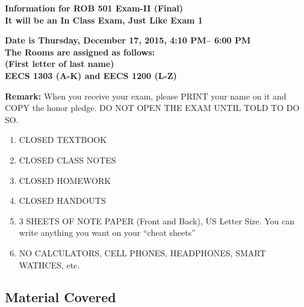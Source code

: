 \documentclass[letterpaper]{article}
\begin{document}



\vspace*{.1in}
\begin{center}
\LARGE \bf
Information for ROB 501 Exam-II (Final)\\
\large
It will be an In Class Exam, Just Like Exam 1
\end{center}
\vspace*{1in}

\begin{center}
\LARGE \bf
Date is Thursday, December 17, 2015, 4:10 PM-- 6:00 PM \\
\large
The Rooms are assigned as follows: \\
(First letter of last name)\\
 EECS 1303 (A-K) and EECS 1200 (L-Z) \\
\end{center}
\vspace*{2in}

\noindent \textbf{Remark:} When you receive your exam, please PRINT your name on it and COPY the honor pledge. DO NOT OPEN THE EXAM UNTIL TOLD TO DO SO.



\vspace*{1in} 
\begin{enumerate}
\item CLOSED TEXTBOOK
\item CLOSED CLASS NOTES
\item CLOSED HOMEWORK
\item CLOSED HANDOUTS
\item  3  SHEETS OF NOTE PAPER (Front and Back), US Letter Size. You can write anything you want on your ``cheat sheets''
\item NO CALCULATORS, CELL PHONES, HEADPHONES, SMART WATHCES, etc.
\end{enumerate}
\vspace*{.4in}


\newpage
\subsection*{Material Covered}
\end{document}
